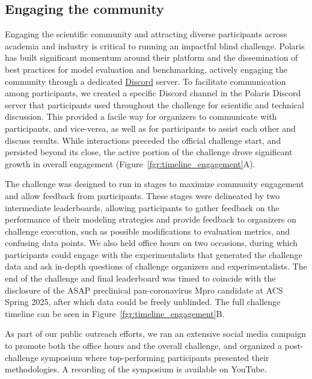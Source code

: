 \documentclass[journal=jcim,manuscript=article]{achemso}
\begin{document}
\subsection{Engaging the community}

Engaging the scientific community and attracting diverse participants across academia and industry is critical to running an impactful blind challenge. Polaris has built significant momentum around their platform and the dissemination of best practices for model evaluation and benchmarking\cite{wognum_call_2024}, actively engaging the community through a dedicated \href{discord.com}{Discord} server. To facilitate communication among participants, we created a specific Discord channel in the Polaris Discord server that participants used throughout the challenge for scientific and technical discussion. This provided a facile way for organizers to communicate with participants, and vice-versa, as well as for participants to assist each other and discuss results. While interactions preceded the official challenge start, and persisted beyond its close, the active portion of the challenge drove significant growth in overall engagement (Figure~\ref{fgr:timeline_engagement}A).

The challenge was designed to run in stages to maximize community engagement and allow feedback from participants. These stages were delineated by two intermediate leaderboards, allowing participants to gather feedback on the performance of their modeling strategies and provide feedback to organizers on challenge execution, such as possible modifications to evaluation metrics, and confusing data points. We also held office hours on two occasions, during which participants could engage with the experimentalists that generated the challenge data and ask in-depth questions of challenge organizers and experimentalists. The end of the challenge and final leaderboard was timed to coincide with the disclosure of the ASAP preclinical pan-coronavirus Mpro candidate at ACS Spring 2025\cite{griffen_2025_acs}, after which data could be freely unblinded. The full challenge timeline can be seen in Figure~\ref{fgr:timeline_engagement}B.

As part of our public outreach efforts, we ran an extensive social media campaign to promote both the office hours and the overall challenge, and organized a post-challenge symposium where top-performing participants presented their methodologies. A recording of the symposium is available on YouTube\cite{openadmet_asap_workshop}. 
\end{document}
